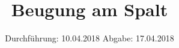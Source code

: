 

\subject{V406}
\title{Beugung am Spalt}
\date{%
  Durchführung: 10.04.2018
  \hspace{3em}
  Abgabe: 17.04.2018
}



\maketitle
\thispagestyle{empty}
\tableofcontents
\newpage
\newpage






\printbibliography{}


